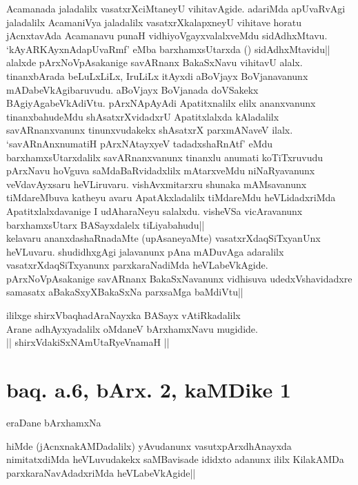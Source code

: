 \begin{artha}
{Acamanada jaladalilx vasatxrXciMtaneyU vihitavAgide. adariMda 
apUvaRvAgi jaladalilx AcamaniVya jaladalilx vasatxrXkalapxneyU 
vihitave horatu jAcnxtavAda Acamanavu punaH vidhiyoVgayxvalalxveMdu 
sidAdhxMtavu.\\
`kAyARKAyxnAdapUvaRmf' eMba barxhamxsUtarxda () sidAdhxMtavidu|| 
alalxde pArxNoVpAsakanige savARnanx BakaSxNavu vihitavU alalx. 
tinanxbArada beLuLxLiLx, IruLiLx itAyxdi aBoVjayx BoVjanavanunx 
mADabeVkAgibaruvudu. aBoVjayx BoVjanada doVSakekx BAgiyAgabeVkAdiVtu. 
pArxNApAyAdi Apatitxnalilx elilx ananxvanunx tinanxbahudeMdu 
shAsatxrXvidadxrU Apatitxlalxda kAladalilx savARnanxvanunx 
tinunxvudakekx shAsatxrX parxmANaveV ilalx. `savARnAnxnumatiH 
pArxNAtayxyeV tadadxshaRnAtf' eMdu barxhamxsUtarxdalilx 
savARnanxvanunx tinanxlu anumati koTiTxruvudu pArxNavu hoVguva 
saMdaBaRvidadxlilx mAtarxveMdu niNaRyavanunx veVdavAyxsaru 
heVLiruvaru. vishAvxmitarxru shunaka mAMsavanunx tiMdareMbuva katheyu 
avaru ApatAkxladalilx tiMdareMdu heVLidadxriMda Apatitxlalxdavanige I 
udAharaNeyu salalxdu. visheVSa vicAravanunx barxhamxsUtarx 
BASayxdalelx tiLiyabahudu||}\\
kelavaru ananxdashaRnadaMte (upAsaneyaMte) vasatxrXdaqSiTxyanUnx 
heVLuvaru. shudidhxgAgi jalavanunx pAna mADuvAga adaralilx 
vasatxrXdaqSiTxyanunx parxkaraNadiMda heVLabeVkAgide. 
pArxNoVpAsakanige savARnanx BakaSxNavanunx vidhisuva udedxVshavidadxre 
samasatx aBakaSxyXBakaSxNa parxsaMga baMdiVtu||
\end{artha}

\begin{center}
ililxge shirxVbaqhadAraNayxka BASayx vAtiRkadalilx\\
Arane adhAyxyadalilx oMdaneV bArxhamxNavu mugidide.\\
|| shirxVdakiSxNAmUtaRyeVnamaH ||
\end{center}


\section*{baq. a.6, bArx. 2, kaMDike 1}

\begin{center}
eraDane bArxhamxNa
\end{center}

\begin{artha}
hiMde (jAcnxnakAMDadalilx) yAvudanunx vasutxpArxdhAnayxda 
nimitatxdiMda heVLuvudakekx saMBavisade ididxto adanunx ililx 
KilakAMDa parxkaraNavAdadxriMda heVLabeVkAgide||
\end{artha}

